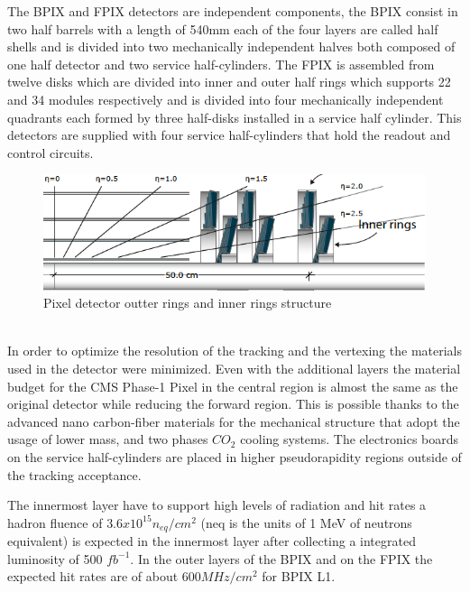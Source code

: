 The BPIX and FPIX detectors are independent components, the BPIX consist in two half barrels with a length of 540mm each of the four layers are called half shells and is divided into two mechanically independent halves both composed of one half detector and two service half-cylinders. The FPIX is assembled from twelve disks which are divided into inner and outer half rings which supports 22 and 34 modules respectively and is divided into four mechanically independent quadrants each formed by three half-disks installed in a service half cylinder. This detectors are supplied with four service half-cylinders that hold the readout and control circuits.
\\
\begin{figure}[h]
    \centering
    \includegraphics[width=1\textwidth]{pixeldetector.png}     
    \caption{Pixel detector outter rings and inner rings structure}
    \label{fig:PixelDetector}
\end{figure}

\\
In order to optimize the resolution of the tracking and the vertexing the materials used in the detector were minimized. Even with the additional layers the material budget for the CMS Phase-1 Pixel in the central region is almost the same as the original detector while reducing the forward region. This is possible thanks to the advanced nano carbon-fiber materials for the mechanical structure that adopt the usage of lower mass, and two phases $CO_{2}$ cooling systems. The electronics boards on the service half-cylinders are placed in higher pseudorapidity regions outside of the tracking acceptance. 

The innermost layer have to support high levels of radiation and hit rates a hadron fluence of $3.6x10^{15} n_{eq}/cm^{2}$ (neq is the units of 1 MeV of neutrons equivalent) is expected in the innermost layer after collecting a integrated luminosity of 500 $fb^{-1}$. In the outer layers of the BPIX and on the FPIX the expected hit rates are of about $600 MHz/cm^{2}$ for BPIX L1. 

